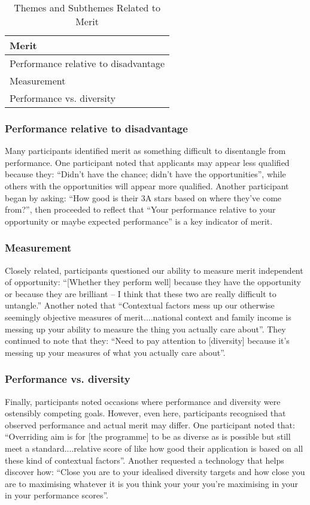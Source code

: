 \begin{table}[h]
    \centering
    \caption{Themes and Subthemes Related to Merit}
    \label{tab:merit}
    \begin{tabular}{|l|}
        \hline
        \textbf{Merit} \\
        \hline
        Performance relative to disadvantage \\
        Measurement \\
        Performance vs. diversity \\
        \hline
    \end{tabular}
\end{table}

\subsubsection{Performance relative to disadvantage}
Many participants identified merit as something difficult to disentangle from performance. One participant noted that applicants may appear less qualified because they: ``Didn't have the chance; didn't have the opportunities'', while others with the opportunities will appear more qualified. Another participant began by asking: ``How good is their 3A stars based on where they've come from?'', then proceeded to reflect that ``Your performance relative to your opportunity or maybe expected performance'' is a key indicator of merit.

\subsubsection{Measurement}
Closely related, participants questioned our ability to measure merit independent of opportunity: ``[Whether they perform well] because they have the opportunity or because they are brilliant – I think that these two are really difficult to untangle.'' Another noted that ``Contextual factors mess up our otherwise seemingly objective measures of merit....national context and family income is messing up your ability to measure the thing you actually care about''. They continued to note that they: ``Need to pay attention to [diversity] because it's messing up your measures of what you actually care about''.

\subsubsection{Performance vs. diversity}
Finally, participants noted occasions where performance and diversity were ostensibly competing goals. However, even here, participants recognised that observed performance and actual merit may differ. One participant noted that: ``Overriding aim is for [the programme] to be as diverse as is possible but still meet a standard....relative score of like how good their application is based on all these kind of contextual factors''. Another requested a technology that helps discover how: ``Close you are to your idealised diversity targets and how close you are to maximising whatever it is you think your your you're maximising in your in your performance scores''.

